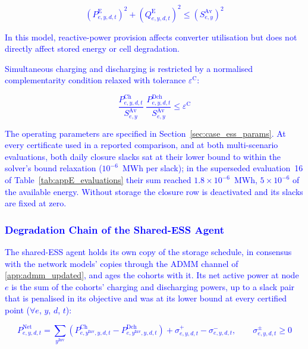 \documentclass[preprint,12pt]{elsarticle}
\begin{document}
\textcolor{blue}{
    \begin{equation}
        \left(P^{\text{E}}_{e,y,d,t}\right)^2
        + \left(Q^{\text{E}}_{e,y,d,t}\right)^2
        \le \left(S^{\text{Av}}_{e,y}\right)^2
        \label{eq:converter_capability}
    \end{equation}
}

\textcolor{blue}{
    In this model, reactive-power provision affects converter utilisation but does not directly affect stored energy or cell degradation.
}

\textcolor{blue}{Simultaneous charging and discharging is restricted by a normalised complementarity condition relaxed with tolerance $\varepsilon^{\text{C}}$:}

\textcolor{blue}{
    \begin{equation}
        \frac{P^{\text{Ch}}_{e,y,d,t}}{S^{\text{Av}}_{e,y}} \; \frac{P^{\text{Dch}}_{e,y,d,t}}{S^{\text{Av}}_{e,y}} \le \varepsilon^{\text{C}}
        \label{eq:network_complementarity}
    \end{equation}
}

\textcolor{blue}{
    The operating parameters are specified in Section~\ref{sec:case_ess_params}.
    At every certificate used in a reported comparison, and at both multi-scenario evaluations, both daily closure slacks sat at their lower bound to within the solver's bound relaxation ($10^{-6}$~MWh per slack); in the superseded evaluation~16 of Table~\ref{tab:appE_evaluations} their sum reached $1.8 \times 10^{-6}$~MWh, $5 \times 10^{-6}$ of the available energy. Without storage the closure row is deactivated and its slacks are fixed at zero.
}

\subsubsection{\textcolor{blue}{Degradation Chain of the Shared-ESS Agent}}

\textcolor{blue}{The shared-ESS agent holds its own copy of the storage schedule, in consensus with the network models' copies through the ADMM channel of \ref{app:admm_updated}, and ages the cohorts with it. Its net active power at node $e$ is the sum of the cohorts' charging and discharging powers, up to a slack pair that is penalised in its objective and was at its lower bound at every certified point ($\forall e$, $y$, $d$, $t$):}

\textcolor{blue}{
    \begin{equation}
        P^{\text{Net}}_{e,y,d,t} = \sum_{y^\text{Inv}} \left( P^{\text{Ch}}_{e,y^\text{Inv},y,d,t} - P^{\text{Dch}}_{e,y^\text{Inv},y,d,t} \right)
        + \sigma^{+}_{e,y,d,t} - \sigma^{-}_{e,y,d,t}, \qquad \sigma^{\pm}_{e,y,d,t} \ge 0
        \label{eq:esso_net_power}
    \end{equation}
}
\end{document}
